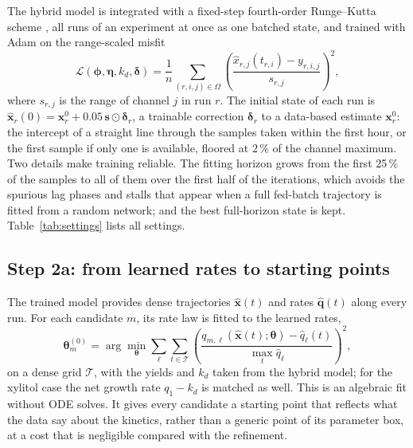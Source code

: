 The hybrid model is integrated with a fixed-step fourth-order Runge--Kutta scheme \citep{Chen2018}, all runs of an experiment at once as one batched state, and trained with Adam \citep{Kingma2015} on the range-scaled misfit
\begin{equation}
\mathcal{L}(\boldsymbol{\phi},\boldsymbol{\eta},k_d,\boldsymbol{\delta}) = \frac{1}{n}\sum_{(r,i,j)\in\Omega}\left(\frac{\hat{x}_{r,j}(t_{r,i}) - y_{r,i,j}}{s_{r,j}}\right)^2 ,
\label{eq:loss}
\end{equation}
where $s_{r,j}$ is the range of channel $j$ in run $r$. The initial state of each run is $\hat{\mathbf{x}}_r(0)=\mathbf{x}^0_r + 0.05\,\mathbf{s}\odot\boldsymbol{\delta}_r$, a trainable correction $\boldsymbol{\delta}_r$ to a data-based estimate $\mathbf{x}^0_r$: the intercept of a straight line through the samples taken within the first hour, or the first sample if only one is available, floored at 2\,\% of the channel maximum. Two details make training reliable. The fitting horizon grows from the first 25\,\% of the samples to all of them over the first half of the iterations, which avoids the spurious lag phases and stalls that appear when a full fed-batch trajectory is fitted from a random network; and the best full-horizon state is kept. Table~\ref{tab:settings} lists all settings.

\subsection{Step 2a: from learned rates to starting points}\label{sec:m:match}
The trained model provides dense trajectories $\hat{\mathbf{x}}(t)$ and rates $\hat{\mathbf{q}}(t)$ along every run. For each candidate $m$, its rate law is fitted to the learned rates,
\begin{equation}
\boldsymbol{\theta}^{(0)}_m = \arg\min_{\boldsymbol{\theta}} \sum_{\ell}\sum_{t\in\mathcal{T}} \left(\frac{q_{m,\ell}(\hat{\mathbf{x}}(t);\boldsymbol{\theta}) - \hat{q}_\ell(t)}{\max_t \hat{q}_\ell}\right)^2 ,
\label{eq:match}
\end{equation}
on a dense grid $\mathcal{T}$, with the yields and $k_d$ taken from the hybrid model; for the xylitol case the net growth rate $q_1-k_d$ is matched as well. This is an algebraic fit without ODE solves. It gives every candidate a starting point that reflects what the data say about the kinetics, rather than a generic point of its parameter box, at a cost that is negligible compared with the refinement.

